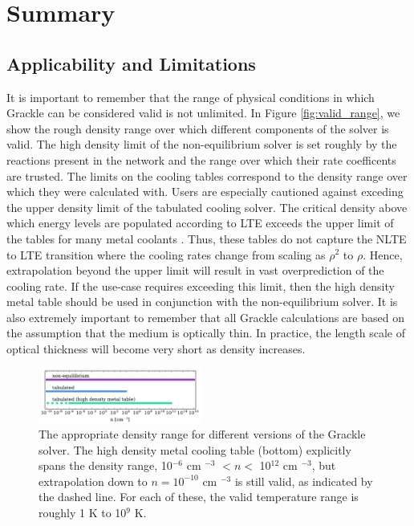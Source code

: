 \section{Summary} \label{sec:summary}

\subsection{Applicability and Limitations}

It is important to remember that the range of physical conditions in
which Grackle can be considered valid is not unlimited.  In Figure
\ref{fig:valid_range}, we show the rough density range over which
different components of the solver is valid.  The high density limit
of the non-equilibrium solver is set roughly by the reactions present
in the network and the range over which their rate coefficents are
trusted.  The limits on the cooling tables correspond to the density
range over which they were calculated with.  Users are especially
cautioned against exceding the upper density limit of the tabulated
cooling solver.  The critical density above which energy levels are
populated according to LTE exceeds the upper limit of the tables for
many metal coolants \citep{2008MNRAS.385.1443S}.  Thus, these tables
do not capture the NLTE to LTE transition where the cooling rates
change from scaling as $\rho^{2}$ to $\rho$.  Hence, extrapolation
beyond the upper limit will result in vast overprediction of the
cooling rate.  If the use-case requires exceeding this limit, then the
high density metal table should be used in conjunction with the
non-equilibrium solver.  It is also extremely important to remember
that all Grackle calculations are based on the assumption that the
medium is optically thin.  In practice, the length scale of optical
thickness will become very short as density increases.

\begin{figure}
  \centering
  \includegraphics[width=0.48\textwidth]{valid_range.pdf}
  \caption{
    The appropriate density range for different versions of the
    Grackle solver.  The high density metal cooling table (bottom)
    explicitly spans the density range, 10$^{-6}$ cm $^{-3}$ $< n <$
    10$^{12}$ cm $^{-3}$, but extrapolation down to $n = 10^{-10}$ cm
    $^{-3}$ is still valid, as indicated by the dashed line.  For each
    of these, the valid temperature range is roughly 1 K to 10$^{9}$
    K.
  } \label{fig:valid-range}
\end{figure}

